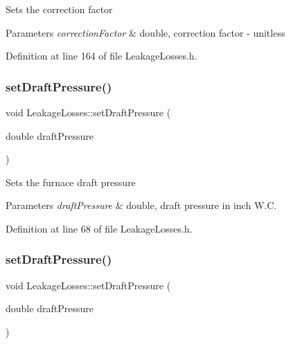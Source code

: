 Sets the correction factor 
\begin{DoxyParams}{Parameters}
{\em correction\+Factor} & double, correction factor -\/ unitless \\
\hline
\end{DoxyParams}


Definition at line 164 of file Leakage\+Losses.\+h.

\mbox{\label{class_leakage_losses_a33f31dc336fc6af0fd1e8c8739f37b1a}} 
\subsubsection{\texorpdfstring{set\+Draft\+Pressure()}{setDraftPressure()}\hspace{0.1cm}{\footnotesize\ttfamily [1/3]}}
{\footnotesize\ttfamily void Leakage\+Losses\+::set\+Draft\+Pressure (\begin{DoxyParamCaption}\item[{double}]{draft\+Pressure }\end{DoxyParamCaption})\hspace{0.3cm}{\ttfamily [inline]}}

Sets the furnace draft pressure 
\begin{DoxyParams}{Parameters}
{\em draft\+Pressure} & double, draft pressure in inch W.\+C. \\
\hline
\end{DoxyParams}


Definition at line 68 of file Leakage\+Losses.\+h.

\mbox{\label{class_leakage_losses_a33f31dc336fc6af0fd1e8c8739f37b1a}} 
\subsubsection{\texorpdfstring{set\+Draft\+Pressure()}{setDraftPressure()}\hspace{0.1cm}{\footnotesize\ttfamily [2/3]}}
{\footnotesize\ttfamily void Leakage\+Losses\+::set\+Draft\+Pressure (\begin{DoxyParamCaption}\item[{double}]{draft\+Pressure }\end{DoxyParamCaption})\hspace{0.3cm}{\ttfamily [inline]}}

